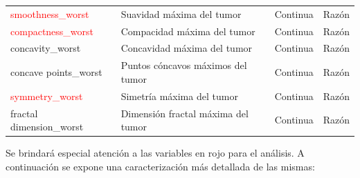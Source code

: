 \documentclass[a4paper, 12pt]{article}
\begin{document}
\begin{table}[ht]
{\begin{tabular}{|p{3.5cm}|p{5.5cm}|p{3.5cm}|p{3.5cm}|}
            \textcolor{red}{smoothness\_worst} & Suavidad máxima del tumor & Continua & Razón \\
            
            \textcolor{red}{compactness\_worst} & Compacidad máxima del tumor & Continua & Razón \\
            
            concavity\_worst & Concavidad máxima del tumor & Continua & Razón \\
            
            concave points\_worst & Puntos cóncavos máximos del tumor & Continua & Razón \\
            
            \textcolor{red}{symmetry\_worst} & Simetría máxima del tumor & Continua & Razón \\
            
            fractal dimension\_worst & Dimensión fractal máxima del tumor & Continua & Razón \\
            \hline
        \end{tabular}
    }
\end{table}
 
Se brindará especial atención a las variables en rojo para el análisis. A continuación se expone una caracterización más detallada de las mismas:
\end{document}
